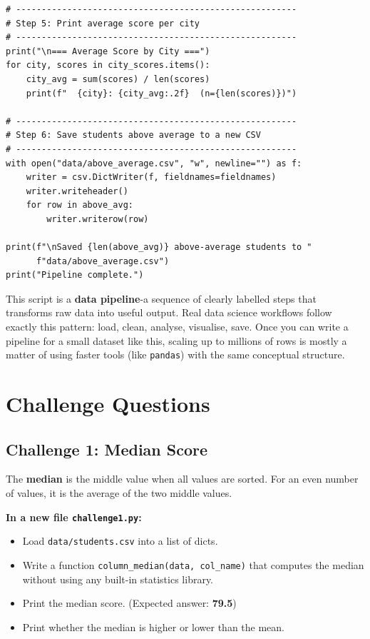 \documentclass{cslab}
\begin{document}
\begin{lstlisting}
# -------------------------------------------------------
# Step 5: Print average score per city
# -------------------------------------------------------
print("\n=== Average Score by City ===")
for city, scores in city_scores.items():
    city_avg = sum(scores) / len(scores)
    print(f"  {city}: {city_avg:.2f}  (n={len(scores)})")

# -------------------------------------------------------
# Step 6: Save students above average to a new CSV
# -------------------------------------------------------
with open("data/above_average.csv", "w", newline="") as f:
    writer = csv.DictWriter(f, fieldnames=fieldnames)
    writer.writeheader()
    for row in above_avg:
        writer.writerow(row)

print(f"\nSaved {len(above_avg)} above-average students to "
      f"data/above_average.csv")
print("Pipeline complete.")
\end{lstlisting}

\begin{note}
This script is a \textbf{data pipeline}-a sequence of clearly labelled steps that transforms raw data into useful output. Real data science workflows follow exactly this pattern: load, clean, analyse, visualise, save. Once you can write a pipeline for a small dataset like this, scaling up to millions of rows is mostly a matter of using faster tools (like \texttt{pandas}) with the same conceptual structure.
\end{note}



\section{Challenge Questions}

\subsection*{Challenge 1: Median Score}

The \textbf{median} is the middle value when all values are sorted. For an even number of values, it is the average of the two middle values.

\textbf{In a new file \texttt{challenge1.py}:}
\begin{itemize}
    \item Load \texttt{data/students.csv} into a list of dicts.
    \item Write a function \texttt{column\_median(data, col\_name)} that computes the median without using any built-in statistics library.
    \item Print the median score. (Expected answer: \textbf{79.5})
    \item Print whether the median is higher or lower than the mean.
\end{itemize}
\end{document}
